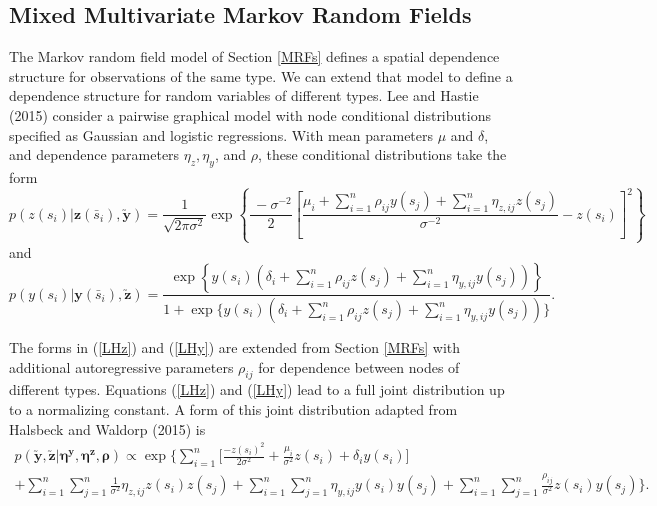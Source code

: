 \documentclass[12pt, a4paper, twoside]{article}
\begin{document}
\subsection{Mixed Multivariate Markov Random Fields} \label{MixedMRF}
The Markov random field model of Section \ref{MRFs} defines a spatial dependence structure for observations of the same type. We can extend that model to define a dependence structure for random variables of different types. Lee and Hastie (2015) consider a pairwise graphical model with node conditional distributions specified as Gaussian and logistic regressions. With mean parameters $\mu$ and $\delta$, and dependence parameters $\eta_z, \eta_y$, and $\rho$, these conditional distributions take the form
\begin{equation} \label{LHz}
 p(z(s_{i}) | \boldsymbol{z}(\bar{s}_i) , \boldsymbol{\utilde{y}}) = \frac{1}{\sqrt {2 \pi \sigma^2}} \exp\left\lbrace \frac{\ -\sigma^{-2}}{2} \left[ \frac{\mu_i + \sum_{i=1}^{n}\rho_{ij}y(s_j) + \sum_{i=1}^{n}\eta_{z,ij}z(s_j)}{\sigma^{-2}} - z(s_i) \right]^{2} \right\rbrace
\end{equation}
and
\begin{equation} \label{LHy}
p(y(s_{i}) | \boldsymbol{y}(\bar{s}_i) , \boldsymbol{\utilde{z}}) = \frac{\exp\left\lbrace y(s_i)\left(\delta_i + \sum_{i=1}^{n}\rho_{ij}z(s_j) +  \sum_{i=1}^{n}\eta_{y,ij}y(s_j) \right)\right\rbrace}
{1 + \exp\lbrace  y(s_i)\left(\delta_i + \sum_{i=1}^{n}\rho_{ij}z(s_j) +  \sum_{i=1}^{n}\eta_{y,ij}y(s_j) \right)\rbrace }  \textbf{.}
\end{equation}

The forms in (\ref{LHz}) and (\ref{LHy}) are extended from Section \ref{MRFs} with additional autoregressive parameters $\rho_{ij}$ for dependence between nodes of different types.
Equations (\ref{LHz}) and (\ref{LHy}) lead to a full joint distribution up to a normalizing constant. A form of this joint distribution adapted from Halsbeck and Waldorp (2015) is
\begin{multline} \label{LHjoint}
p(\boldsymbol{\utilde{y}},\boldsymbol{\utilde{z}} | \boldsymbol{\eta^y,\eta^z,\rho}) \propto
 \exp\lbrace \sum_{i=1}^{n}\lbrack\frac{-z(s_i)^2}{2\sigma^2} + \frac{\mu_i}{\sigma^2}z(s_i) + \delta_i y(s_i) \rbrack\\
  + \sum_{i=1}^{n}\sum_{j=1}^{n}\frac{1}{\sigma^2}\eta_{z,ij}z(s_i)z(s_j) + \sum_{i=1}^{n}\sum_{j=1}^{n}\eta_{y,ij}y(s_i)y(s_j) + \sum_{i=1}^{n}\sum_{j=1}^{n}\frac{\rho_{ij}}{\sigma^2}z(s_i)y(s_j) \rbrace \textbf{.}
 \end{multline}
\end{document}
